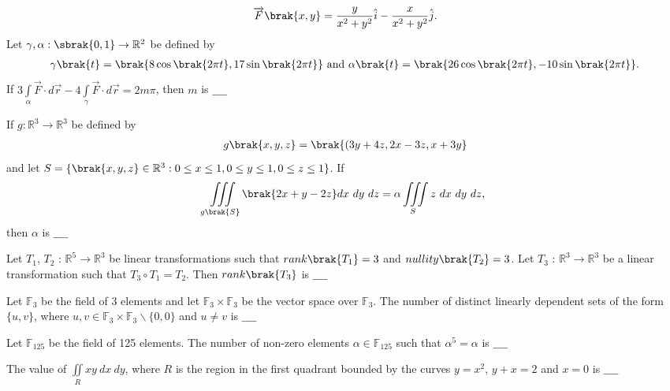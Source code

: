 \begin{align*}
    \overrightarrow{F}\brak{x, y} = \frac{y}{x^2 + y^2}\hat{i} - \frac{x}{x^2 + y^2}\hat{j}.
\end{align*}
Let $\gamma,\alpha:\sbrak{0,1}\rightarrow\mathbb{R}^2$ be defined by
\begin{align*}
    \gamma\brak{t} = \brak{8\cos\brak{2 \pi t}, 17\sin\brak{2 \pi t}}\ \text{and}\ \alpha\brak{t} = \brak{26\cos\brak{2 \pi t}, -10\sin\brak{2 \pi t}}.
\end{align*}
If $3\int\limits_{\alpha} \overrightarrow{F} \cdot d \overrightarrow{r} - 4\int\limits_{\gamma} \overrightarrow{F} \cdot d \overrightarrow{r} = 2m\pi$, then $m$ is $\_\_\_\_$ \\
\item If $g: \mathbb{R}^3 \rightarrow \mathbb{R}^3$ be defined by 
\begin{align*}
    g\brak{x, y, z} = \brak{(3y + 4z, 2x - 3z, x + 3y}
\end{align*} 
and let $S = \{\brak{x, y, z} \in \mathbb{R}^3 : 0 \leq x \leq 1, 0 \leq y \leq 1, 0 \leq z \leq 1\}$. If
\begin{align*}
    \iiint\limits_{g\brak{S}}\brak{2x + y - 2z}dx\ dy\ dz = \alpha\iiint\limits_{S}z\ dx\ dy\ dz,
\end{align*}
then $\alpha$ is $\_\_\_\_$ \\
\item Let $T_1$, $T_2$ : $\mathbb{R}^5 \rightarrow \mathbb{R}^3$ be linear transformations such that $rank\brak{T_1} = 3$ and $nullity\brak{T_2} = 3$. Let
$T_3$ : $\mathbb{R}^3 \rightarrow \mathbb{R}^3$ be a linear transformation such that $T_3 \circ T_1 = T_2$. Then $rank\brak{T_3}$ is $\_\_\_\_$ \\
\item Let $\mathbb{F}_3$ be the field of 3 elements and let $\mathbb{F}_3 \times \mathbb{F}_3$ be the vector space over $\mathbb{F}_3$. The number of
distinct linearly dependent sets of the form $\{u, v\}$, where $u, v \in \mathbb{F}_3 \times \mathbb{F}_3 \backslash \{0, 0\}$ and $u \neq v$ is $\_\_\_\_$ \\
\item Let $\mathbb{F}_{125}$ be the field of 125 elements. The number of non-zero elements $\alpha \in \mathbb{F}_{125}$ such that $\alpha^5 = \alpha$ is $\_\_\_\_$ \\
\item The value of $\iint\limits_{R}xy\ dx\ dy$, where $R$ is the region in the first quadrant bounded by the curves $y = x^2$, $y + x = 2$ and $x = 0$ is $\_\_\_\_$ \\
